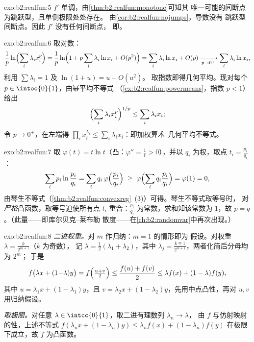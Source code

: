 \begin{solution}{exo:b2:realfun:5}
$f'$ 单调，由\cref{thm:b2:realfun:monotone}可知其
唯一可能的间断点为跳跃型，且单侧极限处处存在。
由\cref{cor:b2:realfun:nojumps}，导数没有
跳跃型间断点。因此 $f'$ 没有任何间断点，
即。
\end{solution}

\begin{solution}{exo:b2:realfun:6}
取对数：
\[
\frac1p \ln\Bigl(\sum_i \lambda_i x_i^p\Bigr)
= \frac1p \ln\Bigl(1 + p\sum_i \lambda_i \ln x_i +
O(p^2)\Bigr)
= \sum_i \lambda_i \ln x_i + O(p)
\xrightarrow[p \to 0^+]{} \sum_i \lambda_i \ln x_i ,
\]
利用 $\sum\lambda_i = 1$ 及 $\ln(1 + u) = u + O(u^2)$。
取指数即得几何平均。现对每个 $p \in
\intoo{0}{1}$，由幂平均不等式
（\cref{ex:b2:realfun:powermeans}，指数 $p < 1$）给出
\[
\Bigl(\sum_i \lambda_i x_i^p\Bigr)^{1/p} \leq \sum_i\lambda_i x_i ;
\]
令 $p \to 0^+$，在左端得 $\prod_i x_i^{\lambda_i}
\leq \sum_i \lambda_i x_i$：即加权算术--几何平均不等式。
\end{solution}

\begin{solution}{exo:b2:realfun:7}
取 $\varphi(t) = t\ln t$（凸：$\varphi'' = \frac1t > 0$），并以
$q_i$ 为权，取点 $t_i = \frac{p_i}{q_i}$：
\[
\sum_i p_i \ln\frac{p_i}{q_i}
= \sum_i q_i\, \varphi\Bigl(\frac{p_i}{q_i}\Bigr)
\;\geq\; \varphi\Bigl(\sum_i q_i \frac{p_i}{q_i}\Bigr)
= \varphi(1) = 0 ,
\]
由琴生不等式（\cref{thm:b2:realfun:convexreg}~(3)）可得。琴生不等式取等号时，
对\emph{严格}凸函数，取等号迫使所有点
$t_i$ 重合：$\frac{p_i}{q_i}$ 为常数，求和知该常数为
$1$，故 $p = q$。（此量——即库尔贝克--莱布勒
散度——在\cref{ch:b2:randomvar}中再次出现。）
\end{solution}

\begin{solution}{exo:b2:realfun:8}
\emph{二进权重。}对 $m$ 作归纳：$m = 1$ 的情形即为
假设。对权重 $\lambda = \frac{k}{2^{m+1}}$（$k$ 为奇数），
记 $\lambda = \frac12(\lambda_1 + \lambda_2)$，其中 $\lambda_j =
\frac{k \mp 1}{2^{m+1}}$，两者化简后分母均为 $2^m$；
于是
\[
f\bigl(\lambda x + (1{-}\lambda)y\bigr)
= f\Bigl(\tfrac{u + v}{2}\Bigr)
\leq \frac{f(u) + f(v)}{2}
\leq \lambda f(x) + (1 - \lambda) f(y),
\]
其中 $u = \lambda_1 x + (1 - \lambda_1)y$，且 $v = \lambda_2 x +
(1-\lambda_2)y$，先用中点凸性，再对
$u, v$ 用归纳假设。

\emph{取极限。}对任意 $\lambda \in
\intcc{0}{1}$，取二进有理数列 $\lambda_n \to \lambda$，
由 $f$ 与仿射映射的性，上述不等式
$f(\lambda_n x + (1-\lambda_n)y) \leq \lambda_n f(x) +
(1-\lambda_n)f(y)$ 在极限下成立，故 $f$ 为凸函数。
\end{solution}

